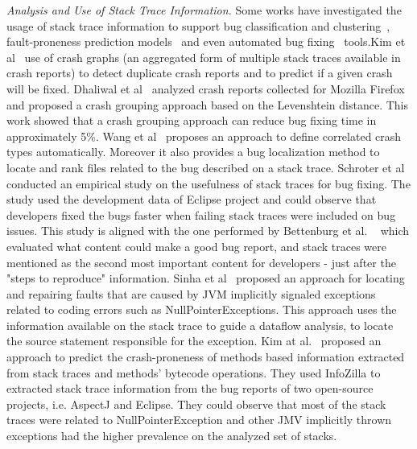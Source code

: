 \documentclass[conference]{IEEEtran}
\begin{document}
\textit{Analysis and Use of Stack Trace Information.} Some works have
investigated the usage of stack trace information to support bug classification
and clustering~\cite{wang2013improving, kim2011crash, dhaliwal2011classifying},
fault-proneness prediction models~\cite{kim2013predicting} and even automated
bug fixing~\cite{sinha2009fault} tools.Kim et al~\cite{kim2011crash} use of
crash graphs (an aggregated form of multiple stack traces available in crash
reports) to detect duplicate crash reports and to predict if a given crash will
be fixed. Dhaliwal et al~\cite{} analyzed crash reports collected for Mozilla
Firefox and proposed a crash grouping approach based on the Levenshtein
distance. This work showed that a crash grouping approach can reduce bug fixing
time in approximately 5\%. Wang et al~\cite{} proposes an approach to define
correlated crash types automatically. Moreover it also provides a bug
localization method to locate and rank files related to the bug described on a
stack trace.  Schroter et al~\cite{schroter2010stack} conducted an empirical
study on the usefulness of stack traces for bug fixing. The study used the
development data of Eclipse project and could observe that developers fixed the
bugs faster when failing stack traces were included on bug issues. This study is
aligned with the one performed by Bettenburg et al. ~\cite{bettenburg2008makes}
which evaluated what content could make a good bug report, and stack traces were
mentioned as the second most important content for developers - just after the
"steps to reproduce" information. Sinha et al~\cite{sinha2009fault} proposed an
approach for locating and repairing faults that are caused by JVM implicitly
signaled exceptions related to coding errors such as NullPointerExceptions. This
approach uses the information available on the stack trace to guide a dataflow
analysis, to locate the source statement responsible for the exception. Kim at
al.~\cite{kim2013predicting} proposed an approach to predict the crash-proneness
of methods based information extracted from stack traces and methods' bytecode
operations. They used InfoZilla to extracted stack trace information from the
bug reports of two open-source projects, i.e. AspectJ and Eclipse. They could
observe that most of the stack traces were related to NullPointerException and
other JMV implicitly thrown exceptions had the higher prevalence on the analyzed
set of stacks.
\end{document}

